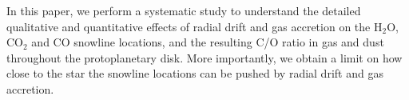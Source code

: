 \documentclass[apj]{emulateapj}
\newcommand{\emgr}[1]{\emph{ \color{gray} #1}}
\begin{document}
In this paper, we perform a systematic study to understand the detailed qualitative and quantitative effects of radial drift and gas accretion on the H$_2$O, CO$_2$ and CO snowline locations, and the resulting C/O ratio in gas and dust throughout the protoplanetary disk. More importantly, we obtain a limit on how close to the star the snowline locations can be pushed by radial drift and gas accretion.   





\end{document}
